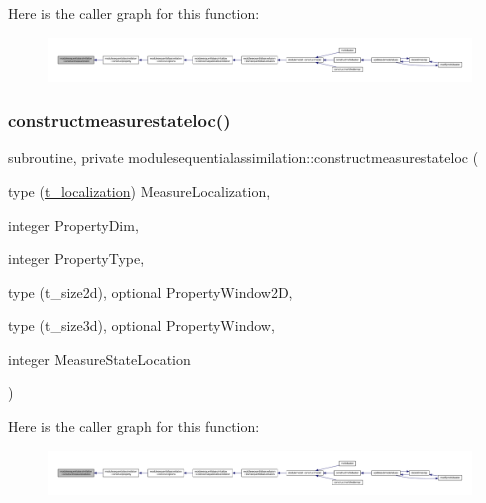 Here is the caller graph for this function\+:\nopagebreak
\begin{figure}[H]
\begin{center}
\leavevmode
\includegraphics[width=350pt]{namespacemodulesequentialassimilation_af3fc907b2e8cf5fb7cad188eb652528d_icgraph}
\end{center}
\end{figure}
\mbox{\label{namespacemodulesequentialassimilation_aa4ca5ec886a894c6fe06ffd71d5fcb55}} 
\subsubsection{\texorpdfstring{constructmeasurestateloc()}{constructmeasurestateloc()}}
{\footnotesize\ttfamily subroutine, private modulesequentialassimilation\+::constructmeasurestateloc (\begin{DoxyParamCaption}\item[{type (\mbox{\hyperlink{structmodulesequentialassimilation_1_1t__localization}{t\+\_\+localization}})}]{Measure\+Localization,  }\item[{integer}]{Property\+Dim,  }\item[{integer}]{Property\+Type,  }\item[{type (t\+\_\+size2d), optional}]{Property\+Window2D,  }\item[{type (t\+\_\+size3d), optional}]{Property\+Window,  }\item[{integer}]{Measure\+State\+Location }\end{DoxyParamCaption})\hspace{0.3cm}{\ttfamily [private]}}

Here is the caller graph for this function\+:\nopagebreak
\begin{figure}[H]
\begin{center}
\leavevmode
\includegraphics[width=350pt]{namespacemodulesequentialassimilation_aa4ca5ec886a894c6fe06ffd71d5fcb55_icgraph}
\end{center}
\end{figure}
\mbox{\label{namespacemodulesequentialassimilation_abc672947c709e077d461068b3e7ae140}} 
